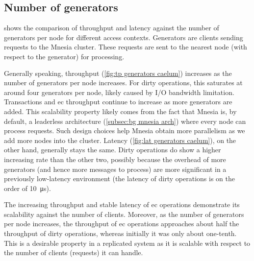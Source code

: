 \subsection{Number of generators} \label{subsec:eval generator number}

 shows the comparison of throughput and latency against
the number of generators per node for different access contexts. Generators are clients 
sending requests to the Mnesia cluster. 
These requests are sent to the nearest node (with respect to the generator) for processing. 

Generally speaking, throughput (\cref{fig:tp generators caelum}) increases as 
the number of generators per node increases. For dirty operations, this saturates 
at around four generators per node, likely caused by I/O bandwidth limitation. 
Transactions and \acrshort{ec} throughput continue to increase as more generators are added. 
This scalability property likely comes from the fact that
Mnesia is, by default, a leaderless architecture (\cref{subsec:bg mnesia arch}) 
where every node can process requests. Such design choices help Mnesia obtain 
more parallelism as we add
more nodes into the cluster. Latency (\cref{fig:lat generators caelum}), on the
other hand, generally stays the same. Dirty operations do show a higher increasing
rate than the other two, possibly because the overhead of more generators (and hence
more messages to process) are more significant in a previously low-latency
environment (the latency of dirty operations is on the order of \qty{10}{\micro\second}).

The increasing throughput and stable latency of \acrshort{ec} operations demonstrate
its scalability against the number of clients. Moreover, as the number of
generators per node increases, the throughput of \acrshort{ec} operations
approaches about half the throughput of dirty operations, whereas initially it was
only about one-tenth. This is a desirable property in a replicated system as
it is scalable with respect to the number of clients (requests) it can handle.

